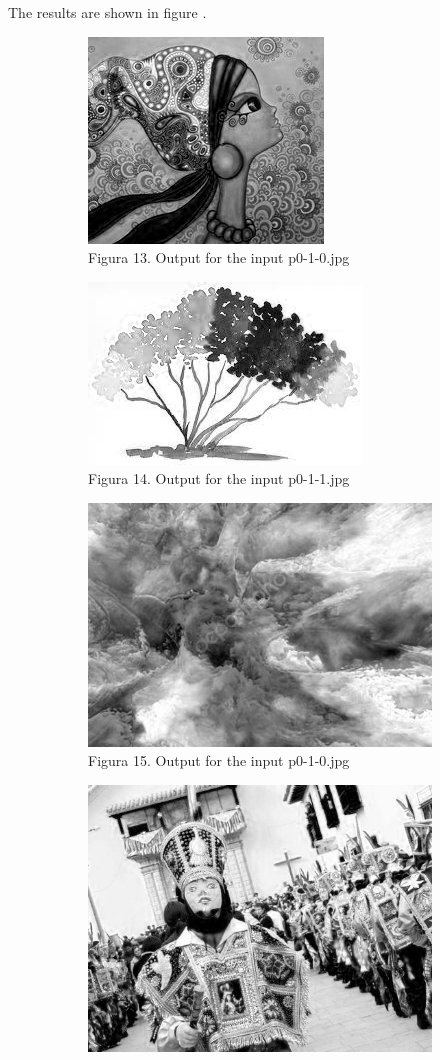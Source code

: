 \begin{enumerate}[label=\emph{\alph*)}]
The results are shown in figure .
\begin{figure}[h!]
\centering
\begin{subfigure}{0.5\textwidth}
  \centering
  \includegraphics[width=0.5\linewidth]{../output/p0-2-c-0.jpg}
  \caption{Figura 13. Output for the input p0-1-0.jpg}
  \label{fig:sfig1}
\end{subfigure}%
\begin{subfigure}{0.5\textwidth}
  \centering
  \includegraphics[width=0.5\linewidth]{../output/p0-2-c-1.jpg}
  \caption{Figura 14. Output for the input p0-1-1.jpg}
  \label{fig:sfig2}
\end{subfigure}
\begin{subfigure}{0.5\textwidth}
  \centering
  \includegraphics[width=0.5\linewidth]{../output/p0-2-c-2.jpg}
  \caption{Figura 15. Output for the input p0-1-0.jpg}
  \label{fig:sfig1}
\end{subfigure}%
\begin{subfigure}{0.5\textwidth}
  \centering
  \includegraphics[width=0.5\linewidth]{../output/p0-2-c-3.jpg}

\end{subfigure}
\end{figure}
\end{enumerate}
